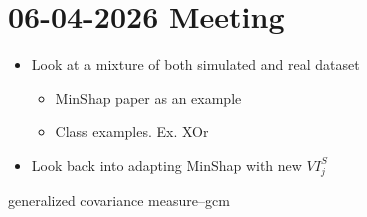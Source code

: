 \documentclass{article}
\begin{document}
\section{06-04-2026 Meeting}

\begin{itemize}
    \item Look at a mixture of both simulated and real dataset 
    \begin{itemize}
        \item MinShap paper as an example 
        \item Class examples. Ex. XOr
    \end{itemize}
    \item Look back into adapting MinShap with new $VI_j^S$
    
\end{itemize}


generalized covariance measure--gcm
\end{document}
